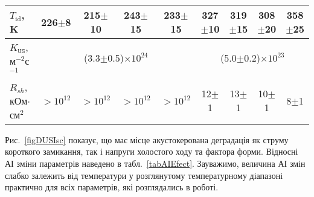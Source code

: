 \begin{table}
\begin{tabular}{|l|c|c|c|c|c|c|c|c|}
$T_\mathrm{id}$, K&226$\pm$8&215$\pm$10&243$\pm$15&233$\pm$15&327$\pm$10&319$\pm$15&308$\pm$20&358$\pm$25\\ \hline
$K_\mathtt{US}$, м$^{-2}$с$^{-1}$&\multicolumn{4}{c|}{(3.3$\pm$0.5)$\times10^{24}$}&\multicolumn{4}{|c|}{(5.0$\pm$0.2)$\times10^{23}$}\\ \hline
$R_{sh}$, кОм$\cdot$см$^2$&$>10^{12}$&$>10^{12}$&$>10^{12}$&$>10^{12}$&12$\pm$1&13$\pm$1&10$\pm$1&8$\pm$1\\ \hline
\end{tabular}
\end{table}

Рис.~\ref{figDUSIsc} показує, що має місце акустокерована деградація як струму короткого замикання, так і напруги холостого ходу та
фактора форми.
Відносні АІ зміни  параметрів наведено в табл.~\ref{tabAIEfect}.
Зауважимо, величина АІ змін слабко залежить від температури у розглянутому температурному діапазоні практично для всіх параметрів, які розглядались в роботі.


